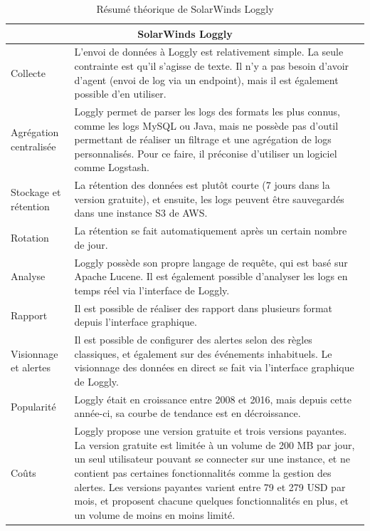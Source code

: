 \documentclass[paper=a4, fontsize=11pt]{scrartcl}
\begin{document}
\centering
\begin{table}[H]
\begin{tabular}{ |p{4cm}||p{12cm}|  }
    \hline
    \multicolumn{2}{|c|}{SolarWinds Loggly} \\
    \hline
    Collecte & L'envoi de données à Loggly est relativement simple. La seule contrainte est qu'il s'agisse de texte. Il n'y a pas besoin d'avoir d'agent (envoi de log via un endpoint), mais il est également possible d'en utiliser.\\
    \hline
    Agrégation centralisée & Loggly permet de parser les logs des formats les plus connus, comme les logs MySQL ou Java, mais ne possède pas d'outil permettant de réaliser un filtrage et une agrégation de logs personnalisés. Pour ce faire, il préconise d'utiliser un logiciel comme Logstash. \\
    \hline
    Stockage et rétention & La rétention des données est plutôt courte (7 jours dans la version gratuite), et ensuite, les logs peuvent être sauvegardés dans une instance S3 de AWS.\\
    \hline
    Rotation & La rétention se fait automatiquement après un certain nombre de jour.\\
    \hline
    Analyse & Loggly possède son propre langage de requête, qui est basé sur Apache Lucene. Il est également possible d'analyser les logs en temps réel via l'interface de Loggly.\\
    \hline
    Rapport & Il est possible de réaliser des rapport dans plusieurs format depuis l'interface graphique.\\
    \hline
    Visionnage et alertes & Il est possible de configurer des alertes selon des règles classiques, et également sur des événements inhabituels. Le visionnage des données en direct se fait via l'interface graphique de Loggly.\\
    \hline
    Popularité & Loggly était en croissance entre 2008 et 2016, mais depuis cette année-ci, sa courbe de tendance est en décroissance.\\
    \hline
    Coûts & Loggly propose une version gratuite et trois versions payantes. La version gratuite est limitée à un volume de 200 MB par jour, un seul utilisateur pouvant se connecter sur une instance, et ne contient pas certaines fonctionnalités comme la gestion des alertes. Les versions payantes varient entre 79 et 279 USD par mois, et proposent chacune quelques fonctionnalités en plus, et un volume de moins en moins limité.\\
    \hline
\end{tabular}
\caption{Résumé théorique de SolarWinds Loggly}
\label{t-resumeLoggly}
\end{table}
\end{document}
